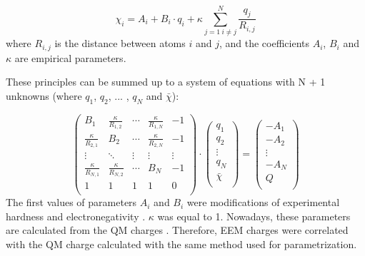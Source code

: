 \begin{equation}
    \chi_i = A_i + B_i \cdot q_i + \kappa \sum^N_{j=1 \: i\neq{j}} \frac{q_j}{R_{i,j}} 
\end{equation}
where $R_{i,j}$ is the distance between atoms $i$ and $j$, and the coefficients
$A_i$, $B_i$ and $\kappa$ are empirical parameters. 

These principles can be summed up to a system of equations with N + 1 unknowns
(where $q_1$, $q_2$, ... , $q_N$ and $\bar{\chi}$):

\begin{equation}
    \left(
    \begin{array}{ccccc}
        B_1                    & \frac{\kappa}{R_{1,2}} & \cdots & \frac{\kappa}{R_{1,N}} & -1     \\
        \frac{\kappa}{R_{2,1}} & B_2                    & \cdots & \frac{\kappa}{R_{2,N}} & -1     \\
        \vdots                 & \ddots                 & \vdots & \vdots                 & \vdots \\
        \frac{\kappa}{R_{N,1}} & \frac{\kappa}{R_{N,2}} & \cdots & B_N                    & -1     \\ 
        1                      & 1                      & 1      & 1                      & 0      \\  
    \end{array}
    \right) \cdot
    \left(
    \begin{array}{c}
        q_1        \\
        q_2        \\
        \vdots     \\
        q_N        \\
        \bar{\chi} \\
    \end{array}
    \right) =
    \left(
    \begin{array}{c}
        -A_1   \\
        -A_2   \\
        \vdots \\
        -A_N   \\
        Q      \\
    \end{array}
    \right)
\end{equation}
The first values of parameters $A_i$ and $B_i$ were modifications
of experimental hardness and electronegativity \cite{Mortier1986}. $\kappa$ was
equal to 1. Nowadays, these parameters are calculated from the QM
charges \cite{Mortier1986, Baekelandt1991, Bultinck2002, Bultinck2004,
Chaves2006, Svobodova2007, Jirouskova2009, Ouyang2009}.
Therefore, EEM charges were correlated with the QM
charge calculated with the same method used for parametrization.

